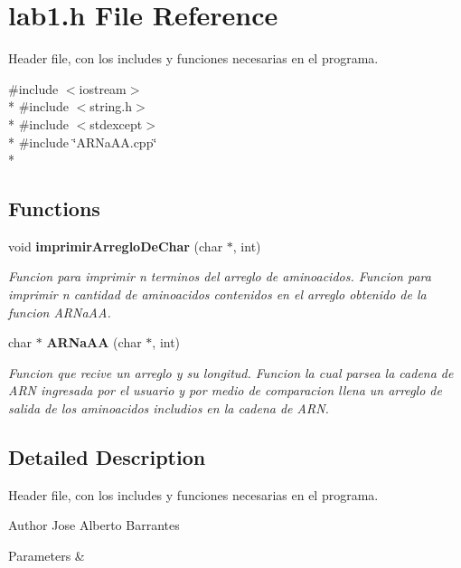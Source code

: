 \section{lab1.\+h File Reference}
\label{lab1_8h}


Header file, con los include\textquotesingle{}s y funciones necesarias en el programa.  


{\ttfamily \#include $<$iostream$>$}\\*
{\ttfamily \#include $<$string.\+h$>$}\\*
{\ttfamily \#include $<$stdexcept$>$}\\*
{\ttfamily \#include \char`\"{}A\+R\+Na\+A\+A.\+cpp\char`\"{}}\\*
\subsection*{Functions}
\begin{DoxyCompactItemize}
\item 
void {\bf imprimir\+Arreglo\+De\+Char} (char $\ast$, int)
\begin{DoxyCompactList}\small\item\em Funcion para imprimir n terminos del arreglo de aminoacidos. Funcion para imprimir n cantidad de aminoacidos contenidos en el arreglo obtenido de la funcion A\+R\+Na\+AA. \end{DoxyCompactList}\item 
char $\ast$ {\bf A\+R\+Na\+AA} (char $\ast$, int)
\begin{DoxyCompactList}\small\item\em Funcion que recive un arreglo y su longitud. Funcion la cual parsea la cadena de A\+RN ingresada por el usuario y por medio de comparacion llena un arreglo de salida de los aminoacidos includios en la cadena de A\+RN. \end{DoxyCompactList}\end{DoxyCompactItemize}


\subsection{Detailed Description}
Header file, con los include\textquotesingle{}s y funciones necesarias en el programa. 

\begin{DoxyAuthor}{Author}
Jose Alberto Barrantes 
\end{DoxyAuthor}

\begin{DoxyParams}{Parameters}
{\em } & \\
\hline
\end{DoxyParams}


